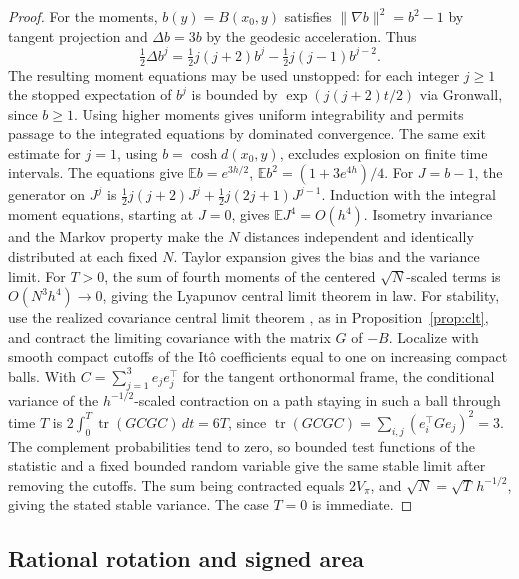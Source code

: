 \documentclass[11pt,reqno]{amsart}
\theoremstyle{definition}
\theoremstyle{remark}
\numberwithin{equation}{section}
\begin{document}
\begin{proof}
For the moments, \(b(y)=B(x_0,y)\) satisfies
\(\|\nabla b\|^2=b^2-1\) by tangent projection and
\(\Delta b=3b\) by the geodesic acceleration. Thus
\[
 \tfrac12\Delta b^j=\tfrac12 j(j+2)b^j
          -\tfrac12j(j-1)b^{j-2}.
\]
The resulting moment equations may be used unstopped: for each integer
\(j\ge1\) the stopped expectation of \(b^j\) is bounded by
\(\exp(j(j+2)t/2)\) via Gronwall, since \(b\ge1\).
Using higher moments gives uniform integrability and permits passage
to the integrated equations by dominated convergence. The same
exit estimate for \(j=1\), using \(b=\cosh d(x_0,y)\), excludes
explosion on finite time intervals. The equations give
\(\mathbb E b=e^{3h/2}\), \(\mathbb E b^2=(1+3e^{4h})/4\).
For \(J=b-1\), the generator on \(J^j\) is
\(\tfrac12j(j+2)J^j+\tfrac12j(2j+1)J^{j-1}\).
Induction with the integral moment equations, starting at \(J=0\),
gives \(\mathbb E J^4=O(h^4)\).
Isometry invariance and the Markov property make the \(N\) distances
independent and identically distributed at each fixed \(N\).
Taylor expansion gives the bias and the variance limit.
For \(T>0\), the sum of fourth moments of the centered
\(\sqrt N\)-scaled terms is \(O(N^3h^4)\to0\), giving the Lyapunov
central limit theorem in law. For stability, use the realized
covariance central limit theorem \cite[Theorem~5.4.2]{JP12},
as in Proposition~\ref{prop:clt}, and contract the limiting covariance
with the matrix \(G\) of \(-B\). Localize with smooth compact cutoffs
of the It\^o coefficients equal to one on increasing compact balls.
With \(C=\sum_{j=1}^3 e_je_j^\top\) for the tangent orthonormal frame,
the conditional variance of the \(h^{-1/2}\)-scaled contraction
on a path staying in such a ball through time \(T\) is
\(2\int_0^T\operatorname{tr}(GCGC)\,dt=6T\), since
\(\operatorname{tr}(GCGC)=\sum_{i,j}(e_i^\top G e_j)^2=3\).
The complement probabilities tend to zero, so bounded test functions
of the statistic and a fixed bounded random variable give the same
stable limit after removing the cutoffs. The sum being contracted
equals \(2V_\pi\), and \(\sqrt N=\sqrt T\,h^{-1/2}\), giving the
stated stable variance. The case \(T=0\) is immediate.
\end{proof}

\subsection{Rational rotation and signed area}
\end{document}
